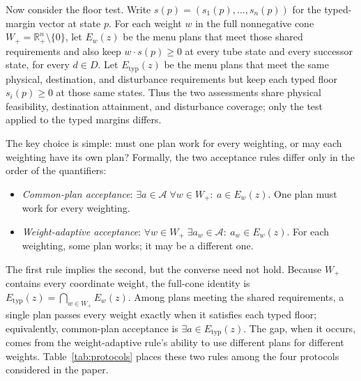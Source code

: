 \documentclass[preprint,11pt,authoryear]{elsarticle}
\theoremstyle{definition}
\theoremstyle{remark}
\newcommand{\Etyp}{E_{\mathrm{typ}}}
\newcommand{\Wp}{W_+}
\newcommand{\Rp}{\mathbb{R}^n_+}
\begin{document}
\begin{samepage}
Now consider the floor test. Write $s(p)=(s_1(p),\dots,s_n(p))$ for the typed-margin vector at state $p$. For each weight $w$ in the full nonnegative cone $\Wp=\Rp\setminus\{0\}$, let $E_w(z)$ be the menu plans that meet those shared requirements and also keep $w\cdot s(p)\ge0$ at every tube state and every successor state, for every $d\in D$. Let $\Etyp(z)$ be the menu plans that meet the same physical, destination, and disturbance requirements but keep each typed floor $s_i(p)\ge0$ at those same states. Thus the two assessments share physical feasibility, destination attainment, and disturbance coverage; only the test applied to the typed margins differs.
\end{samepage}

The key choice is simple: must one plan work for every weighting, or may each weighting have its own plan? Formally, the two acceptance rules differ only in the order of the quantifiers:
\begin{itemize}[leftmargin=2em]
\item \emph{Common-plan acceptance}: $\exists a\in\mathcal A\;\forall w\in\Wp:\ a\in E_w(z)$. One plan must work for every weighting.
\item \emph{Weight-adaptive acceptance}: $\forall w\in\Wp\;\exists a_w\in\mathcal A:\ a_w\in E_w(z)$. For each weighting, some plan works; it may be a different one.
\end{itemize}
The first rule implies the second, but the converse need not hold. Because $\Wp$ contains every coordinate weight, the full-cone identity is $\Etyp(z)=\bigcap_{w\in\Wp}E_w(z)$. Among plans meeting the shared requirements, a single plan passes every weight exactly when it satisfies each typed floor; equivalently, common-plan acceptance is $\exists a\in\Etyp(z)$. The gap, when it occurs, comes from the weight-adaptive rule's ability to use different plans for different weights. Table~\ref{tab:protocols} places these two rules among the four protocols considered in the paper.
\end{document}
